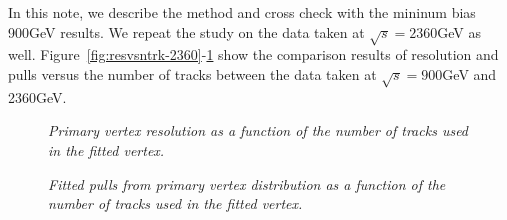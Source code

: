 In this note, we describe the method and cross check with the mininum bias 900GeV results. 
We repeat the study on the data taken at $\sqrt{s}=2360$GeV as well. 
Figure~\ref{fig:resvsntrk-2360}-\ref{fig:pullvsntrk-2360} show the 
comparison results of resolution and pulls versus the number of tracks 
between the data taken at $\sqrt{s}=900$GeV and 2360GeV.

\begin{figure}[htb]
\begin{center}
\centerline{
}
\caption{\sl
Primary vertex resolution as a function of the number of tracks used in the 
fitted vertex.
}
\label{fig:resvsntrk-2360}
\end{center}
\begin{center}
\centerline{
}
\caption{\sl
Fitted pulls from primary vertex distribution as a function of the number of tracks used in the 
fitted vertex.}
\label{fig:pullvsntrk-2360}
\end{center}
\end{figure}
